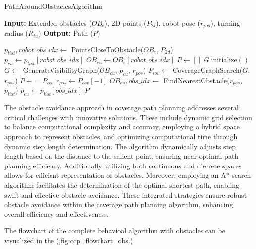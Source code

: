 \begin{algorithm}[H]     
    \caption{PathAroundObstaclesAlgorithm}  
    \label{alg:path_around_obstacles_algorithm}
    \begin{algorithmic}[1]
    \Statex \textbf{Input:} Extended obstacles ($OB_e$), 2D points ($P_{2d}$), robot pose ($r_{pos}$), turning radius ($R_{tu}) $
    \Statex \textbf{Output:} Path ($P$)
    \newline
    
    \State $p_{list}, robot\_obs\_idx \leftarrow$ PointsCloseToObstacle($OB_e$, $P_{2d}$)
    \State $p_{cu} \leftarrow p_{list}[robot\_obs\_idx]$    
    \State $OB_{cu} \leftarrow OB_e[robot\_obs\_idx]$
    \State $P \leftarrow []$
        \State $G.\text{initialize}()$
        \State $G \leftarrow$ GenerateVisibilityGraph($OB_{cu}$, $p_{cu}$, $r_{pos}$)
        \State $P_{cov} \leftarrow$ CoverageGraphSearch($G$, $r_{pos}$)
        \State $P \mathrel{+}= P_{cov}$
        \State $r_{pos} \leftarrow P_{cov}[-1]$
        \State $OB_{cu}, obs\_idx \leftarrow$ FindNearestObstacle($r_{pos}$, $p_{list}$)
        \State $p_{cu} \leftarrow p_{list}[obs\_idx]$
    \EndFor
    \State \Return $P$
    \end{algorithmic}
    \end{algorithm}


The obstacle avoidance approach in coverage path planning addresses several critical challenges with innovative solutions. These include dynamic grid selection to balance computational complexity and accuracy, employing a hybrid space approach to represent obstacles, and optimizing computational time through dynamic step length determination. The algorithm dynamically adjusts step length based on the distance to the salient point, ensuring near-optimal path planning efficiency. Additionally, utilizing both continuous and discrete spaces allows for efficient representation of obstacles. Moreover, employing an A* search algorithm facilitates the determination of the optimal shortest path, enabling swift and effective obstacle avoidance. These integrated strategies ensure robust obstacle avoidance within the coverage path planning algorithm, enhancing overall efficiency and effectiveness.


\vspace*{6mm}   


The flowchart of the complete behavioal algorithm with obstacles can be visualized in the (\autoref{fig:ccp_flowchart_obs})


